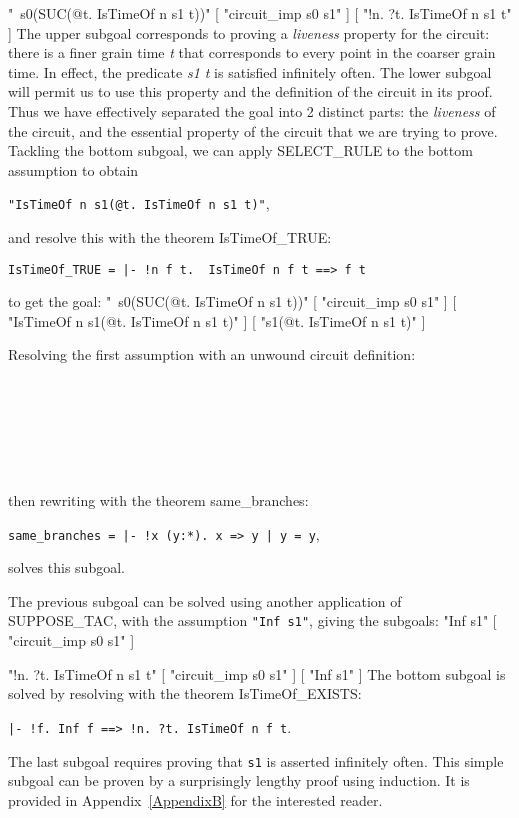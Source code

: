 "~s0(SUC(@t. IsTimeOf n s1 t))"
    [ "circuit_imp s0 s1" ]
    [ "!n. ?t. IsTimeOf n s1 t" ]
\endtt
The upper subgoal corresponds to proving a {\it liveness\/} property for
the circuit: there is a finer grain time {\it t\/} that corresponds
to every point in the coarser grain time.  In effect, the predicate
{\it s1 t\/} is satisfied infinitely often.  The lower subgoal
will permit us to use this property and the definition of the circuit
in its proof.  Thus we have effectively separated
the goal into 2 distinct parts: the {\it liveness\/} of the circuit, and
the essential property of the circuit that we are trying to prove.
Tackling the bottom subgoal, we can apply SELECT\_RULE to the bottom
assumption to obtain
\begin{center}
\verb+"IsTimeOf n s1(@t. IsTimeOf n s1 t)"+,
\end{center}
and resolve this with the theorem IsTimeOf\_TRUE:
\begin{center}
\verb+IsTimeOf_TRUE = |- !n f t.  IsTimeOf n f t ==> f t+
\end{center}
to get the goal:
\begintt
"~s0(SUC(@t. IsTimeOf n s1 t))"
    [ "circuit_imp s0 s1" ]
    [ "IsTimeOf n s1(@t. IsTimeOf n s1 t)" ]
    [ "s1(@t. IsTimeOf n s1 t)" ]
\endtt

Resolving the first assumption with an unwound circuit definition:
\begin{center}
\\
\\
\\
\\
\\
\end{center}
then rewriting with the theorem same\_branches:
\begin{center}
\verb+same_branches = |- !x (y:*). x => y | y = y+,
\end{center}
solves this subgoal.

The previous subgoal can be solved using another application of
SUPPOSE\_TAC, with the assumption \verb+"Inf s1"+, giving the
subgoals: 
\begintt
"Inf s1"
    [ "circuit_imp s0 s1" ]

"!n. ?t. IsTimeOf n s1 t"
    [ "circuit_imp s0 s1" ]
    [ "Inf s1" ]
\endtt
The bottom subgoal is solved by resolving with the theorem
IsTimeOf\_EXISTS: 
\begin{center}
\verb+|- !f. Inf f ==> !n. ?t. IsTimeOf n f t+.
\end{center}
The last subgoal requires proving that \verb+s1+ is asserted
infinitely often.  This simple subgoal can be proven by a surprisingly
lengthy proof using induction.  It is provided in
Appendix~\ref{AppendixB} for the interested reader.  

